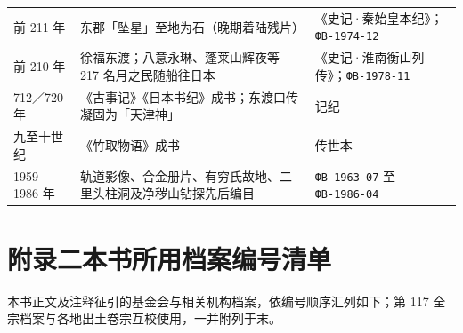 {\begin{longtable}{@{}p{32mm}p{60mm}p{40mm}@{}}
前 211 年 & 东郡「坠星」至地为石（晚期着陆残片） & 《史记·秦始皇本纪》；\texttt{ФВ-1974-12} \\
前 210 年 & 徐福东渡；八意永琳、蓬莱山辉夜等 217 名月之民随船往日本 & 《史记·淮南衡山列传》；\texttt{ФВ-1978-11} \\
712／720 年 & 《古事记》《日本书纪》成书；东渡口传凝固为「天津神」 & 记纪 \\
九至十世纪 & 《竹取物语》成书 & 传世本 \\
1959—1986 年 & 轨道影像、合金册片、有穷氏故地、二里头柱洞及净秽山钻探先后编目 & \texttt{ФВ-1963-07} 至 \texttt{ФВ-1986-04} \\
\end{longtable}}

\clearpage
\chapter*{附录二\quad 本书所用档案编号清单}
{}

本书正文及注释征引的基金会与相关机构档案，依编号顺序汇列如下；第 117 全宗档案与各地出土卷宗互校使用，一并附列于末。

